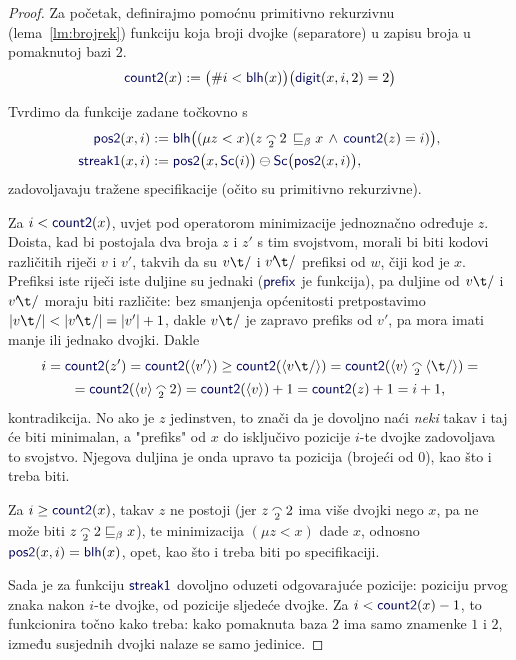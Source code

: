 \begin{proof}
Za početak, definirajmo pomoćnu primitivno rekurzivnu (lema~\ref{lm:brojrek}) funkciju koja broji dvojke (separatore) u zapisu broja u pomaknutoj bazi $2$.
\begin{equation}
    \f{count2}(x):=\bigl(\#i<\f{blh}(x)\bigr)\bigl(\f{digit}(x,i,2)=2\bigr)
\end{equation}

Tvrdimo da funkcije zadane točkovno s
\begin{align}
    \f{pos2}(x,i)&:=\f{blh}\bigl((\mu z<x)(z\conc22\,\sqsubseteq_\beta x\,\land\,\f{count2}(z)=i)\bigr),\\
    \f{streak1}(x,i)&:=\f{pos2}\bigl(x,\f{Sc}(i)\bigr)\ominus\f{Sc}\bigl(\f{pos2}(x,i)\bigr),
\end{align}
zadovoljavaju tražene specifikacije (očito su primitivno rekurzivne).

Za $i<\f{count2}(x)$, uvjet pod operatorom minimizacije jednoznačno određuje $z$. Doista, kad bi postojala dva broja $z$ i $z'$ s tim svojstvom, morali bi biti kodovi različitih riječi $v$ i $v'$, takvih da su $v\t/$ i $v'\!\t/$ prefiksi od $w$, čiji kod je $x$. Prefiksi iste riječi iste duljine su jednaki ($\f{prefix}$ je funkcija), pa duljine od $v\t/$ i $v'\!\t/$ moraju biti različite: bez smanjenja općenitosti pretpostavimo $\dulj{v\t/}<\dulj{v'\!\t/}=\dulj{v'}+1$, dakle $v\t/$ je zapravo prefiks od $v'$, pa mora imati manje ili jednako dvojki. Dakle
\begin{multline}
    i=\f{count2}(z')=\f{count2}(\kr{v'})\ge\f{count2}(\kr{v\t/})=\f{count2}(\kr v\conc2\kr{\t/})=\\
    =\f{count2}(\kr v\conc22)=\f{count2}(\kr v)+1=\f{count2}(z)+1=i+1\text,
\end{multline}
kontradikcija. No ako je $z$ jedinstven, to znači da je dovoljno naći \emph{neki} takav i taj će biti minimalan, a "prefiks" od $x$ do isključivo pozicije $i$-te dvojke zadovoljava to svojstvo. Njegova duljina je onda upravo ta pozicija (brojeći od $0$), kao što i treba biti.

Za $i\ge\f{count2}(x)$, takav $z$ ne postoji (jer $z\conc22$ ima više dvojki nego $x$, pa ne može biti $z\conc22\sqsubseteq_\beta x$), te minimizacija $(\mu z<x)$ dade $x$, odnosno $\f{pos2}(x,i)=\f{blh}(x)$, opet, kao što i treba biti po specifikaciji.

Sada je za funkciju $\f{streak1}$ dovoljno oduzeti odgovarajuće pozicije: poziciju prvog znaka nakon $i$-te dvojke, od pozicije sljedeće dvojke. Za $i<\f{count2}(x)-1$, to funkcionira točno kako treba: kako pomaknuta baza $2$ ima samo znamenke $1$ i $2$, između susjednih dvojki nalaze se samo jedinice.


\end{proof}
